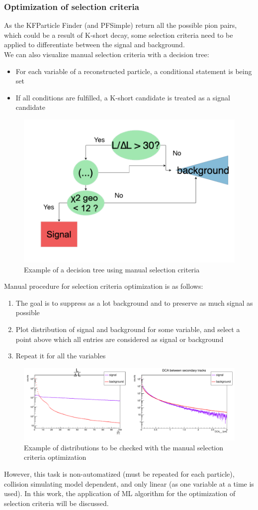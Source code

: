 \subsubsection{Optimization of selection criteria}
As the KFParticle Finder (and PFSimple) return all the possible pion pairs, which could be a result of K-short decay,  some selection criteria need to be applied to differentiate between the signal and background.\\

We can also visualize manual selection criteria with a decision tree:
\begin{itemize}
    \item For each variable of a reconstructed particle, a conditional statement is being set
    \item If all conditions are fulfilled, a K-short candidate is treated as a signal  candidate
\end{itemize}

\begin{figure}[H]
    \centering
    \includegraphics[width=.6\textwidth]{img/decision_tree.png}
    \caption{Example of a decision tree using manual selection criteria}
\end{figure}

Manual procedure for selection criteria optimization \cite{lubynets} is as follows:
\begin{enumerate}
    \item The goal is to suppress as a lot background and to preserve as much signal as possible 
    \item Plot distribution of signal and background for some variable, and select a point above which all entries are considered as signal or background
    \item Repeat it for all the variables
\end{enumerate}
\begin{figure}[H]
    \centering
    \includegraphics[width=1\textwidth]{img/pfsimple_distributions.pdf}
     \caption{Example of distributions to be checked with the manual selection criteria optimization}
\end{figure}

However, this task is non-automatized (must be repeated for each particle), collision simulating model dependent, and only linear (as one variable at a time is used). In this work, the application of ML algorithm for the optimization of selection criteria will be discussed.
